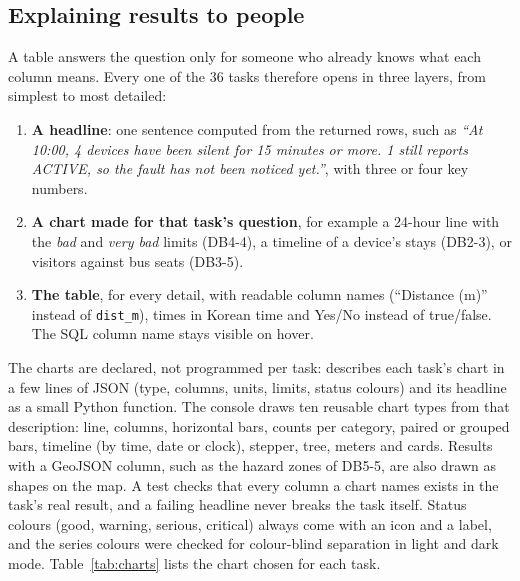 \documentclass[11pt,a4paper]{article}
\begin{document}
\subsection{Explaining results to people}\label{sec:viz}

A table answers the question only for someone who already knows what each column means. Every
one of the 36 tasks therefore opens in three layers, from simplest to most detailed:

\begin{enumerate}
  \item \textbf{A headline}: one sentence computed from the returned rows, such as
    \emph{``At 10:00, 4 devices have been silent for 15 minutes or more. 1 still reports ACTIVE, so
    the fault has not been noticed yet.''}, with three or four key numbers.
  \item \textbf{A chart made for that task's question}, for example a 24-hour line with the
    \emph{bad} and \emph{very bad} limits (DB4-4), a timeline of a device's stays (DB2-3), or
    visitors against bus seats (DB3-5).
  \item \textbf{The table}, for every detail, with readable column names (``Distance (m)''
    instead of \texttt{dist\_m}), times in Korean time and Yes/No instead of true/false. The SQL
    column name stays visible on hover.
\end{enumerate}

The charts are declared, not programmed per task:  describes each task's
chart in a few lines of JSON (type, columns, units, limits, status colours) and its headline as a
small Python function. The console draws ten reusable chart types from that description: line,
columns, horizontal bars, counts per category, paired or grouped bars, timeline (by time, date or
clock), stepper, tree, meters and cards. Results with a GeoJSON column, such as the hazard zones of
DB5-5, are also drawn as shapes on the map. A test checks that
every column a chart names exists in the task's real result, and a failing headline never breaks
the task itself. Status colours (good, warning, serious, critical) always come with an icon and a
label, and the series colours were checked for colour-blind separation in light and dark mode.
Table~\ref{tab:charts} lists the chart chosen for each task.
\end{document}
